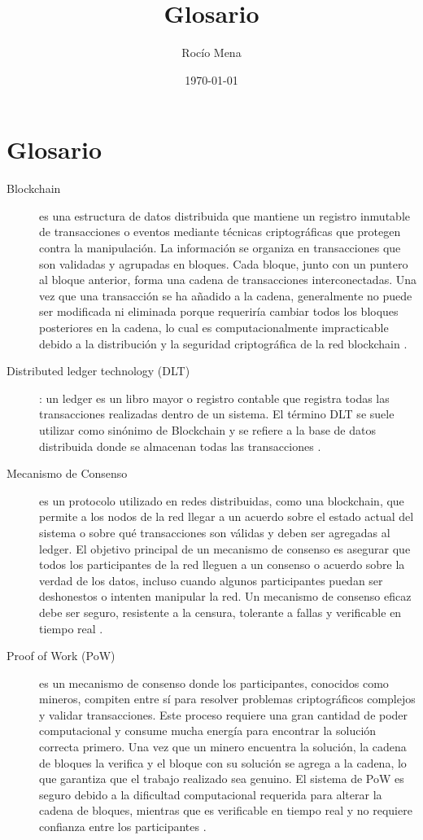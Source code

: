 \documentclass[main.tex]{subfiles}
\title{Glosario}
\author{Rocío Mena}
\date{\today}
\begin{document}
\maketitle

\section{Glosario}


\begin{description}
	\item[Blockchain] es una estructura de datos distribuida que mantiene un registro inmutable de transacciones o eventos mediante técnicas criptográficas que protegen contra la manipulación. La información se organiza en transacciones que son validadas y agrupadas en bloques. Cada bloque, junto con un puntero al bloque anterior, forma una cadena de transacciones interconectadas. Una vez que una transacción se ha añadido a la cadena, generalmente no puede ser modificada ni eliminada porque requeriría cambiar todos los bloques posteriores en la cadena, lo cual es computacionalmente impracticable debido a la distribución y la seguridad criptográfica de la red blockchain \cite{rennock2018blockchain}.

	\item[Distributed ledger technology (DLT)]: un ledger es un libro mayor o registro contable que registra todas las transacciones realizadas dentro de un sistema. El término DLT se suele utilizar como sinónimo de Blockchain y se refiere a la base de datos distribuida donde se almacenan todas las transacciones \cite{rennock2018blockchain}.

	\item[Mecanismo de Consenso] es un protocolo utilizado en redes distribuidas, como una blockchain, que permite a los nodos de la red llegar a un acuerdo sobre el estado actual del sistema o sobre qué transacciones son válidas y deben ser agregadas al ledger. El objetivo principal de un mecanismo de consenso es asegurar que todos los participantes de la red lleguen a un consenso o acuerdo sobre la verdad de los datos, incluso cuando algunos participantes puedan ser deshonestos o intenten manipular la red. Un mecanismo de consenso eficaz debe ser seguro, resistente a la censura, tolerante a fallas y verificable en tiempo real \cite{diaz2022protocolos}.

	\item[Proof of Work (PoW)] es un mecanismo de consenso donde los participantes, conocidos como mineros, compiten entre sí para resolver problemas criptográficos complejos y validar transacciones. Este proceso requiere una gran cantidad de poder computacional y consume mucha energía para encontrar la solución correcta primero. Una vez que un minero encuentra la solución, la cadena de bloques la verifica y el bloque con su solución se agrega a la cadena, lo que garantiza que el trabajo realizado sea genuino. El sistema de PoW es seguro debido a la dificultad computacional requerida para alterar la cadena de bloques, mientras que es verificable en tiempo real y no requiere confianza entre los participantes \cite{rennock2018blockchain}.


\end{description}
\end{document}
